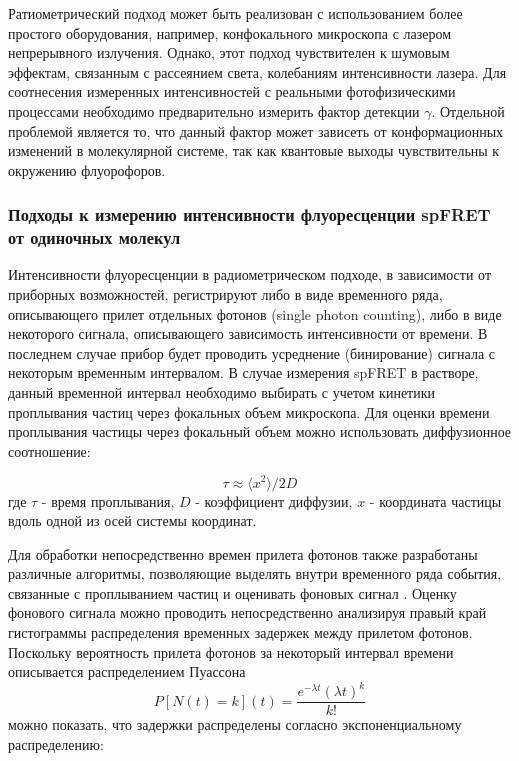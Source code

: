 Ратиометрический подход может быть реализован с использованием более простого оборудования, например, конфокального микроскопа с лазером непрерывного излучения. Однако, этот подход чувствителен к шумовым эффектам, связанным с рассеянием света, колебаниям интенсивности лазера. Для соотнесения измеренных интенсивностей с реальными фотофизическими процессами необходимо предварительно измерить фактор детекции $\gamma$. Отдельной проблемой является то, что данный фактор может зависеть от конформационных изменений в молекулярной системе, так как квантовые выходы чувствительны к окружению флуорофоров.


\subsubsection{Подходы к измерению интенсивности флуоресценции spFRET от одиночных молекул}

Интенсивности флуоресценции в радиометрическом подходе, в зависимости от приборных возможностей, регистрируют либо в виде временного ряда, описывающего прилет отдельных фотонов (single photon counting), либо в виде некоторого сигнала, описывающего зависимость интенсивности от времени. В последнем случае прибор будет проводить усреднение (бинирование) сигнала с некоторым временным интервалом. В случае измерения spFRET в растворе, данный временной интервал необходимо выбирать с учетом кинетики проплывания частиц через фокальных объем микроскопа.
Для оценки времени проплывания частицы через фокальный объем можно использовать диффузионное соотношение:
 
\begin{equation}
    \tau \approx \langle x^2 \rangle / 2D
\end{equation}
    где $\tau$ - время проплывания, $D$ - коэффициент диффузии, $x$ - координата частицы вдоль одной из осей системы координат.
    
Для обработки непосредственно времен прилета фотонов также разработаны различные алгоритмы, позволяющие выделять внутри временного ряда события, связанные с проплыванием частиц и оценивать фоновых сигнал \cite{ingargiola_fretbursts_2016}. 
Оценку фонового сигнала можно проводить непосредственно анализируя правый край гистограммы распределения временных задержек между прилетом фотонов. Поскольку вероятность прилета фотонов за некоторый интервал времени описывается распределением Пуассона
\begin{equation}
    P[N(t)=k](t) = \frac{e^{-\lambda t} (\lambda t)^k}{k!}
\end{equation}
можно показать, что задержки распределены согласно экспоненциальному распределению:

